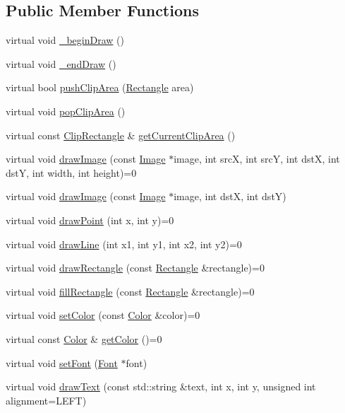 \subsection*{Public Member Functions}
\begin{DoxyCompactItemize}
\item 
virtual void \hyperlink{classgcn_1_1Graphics_a85e8107504f70fa460b844fb2259c653}{\+\_\+begin\+Draw} ()
\item 
virtual void \hyperlink{classgcn_1_1Graphics_af6b9381e34ec34f10e9bbf77b7b00c78}{\+\_\+end\+Draw} ()
\item 
virtual bool \hyperlink{classgcn_1_1Graphics_ab8f8773da6aa70f5fb554c2a2815c496}{push\+Clip\+Area} (\hyperlink{classgcn_1_1Rectangle}{Rectangle} area)
\item 
virtual void \hyperlink{classgcn_1_1Graphics_a11a3be7969db7490df8a02cb4549b443}{pop\+Clip\+Area} ()
\item 
virtual const \hyperlink{classgcn_1_1ClipRectangle}{Clip\+Rectangle} \& \hyperlink{classgcn_1_1Graphics_a642535039e421b0530bd85d71b8f7151}{get\+Current\+Clip\+Area} ()
\item 
virtual void \hyperlink{classgcn_1_1Graphics_aeb284b30f59d5cfa4c4e25130f4c164e}{draw\+Image} (const \hyperlink{classgcn_1_1Image}{Image} $\ast$image, int srcX, int srcY, int dstX, int dstY, int width, int height)=0
\item 
virtual void \hyperlink{classgcn_1_1Graphics_aed30c3aa213a2d225b1c119b3f5f8d60}{draw\+Image} (const \hyperlink{classgcn_1_1Image}{Image} $\ast$image, int dstX, int dstY)
\item 
virtual void \hyperlink{classgcn_1_1Graphics_adfd989a2a8c6771c6368b25f3977ecf4}{draw\+Point} (int x, int y)=0
\item 
virtual void \hyperlink{classgcn_1_1Graphics_a92af7e5f5ed6ebf692803bc1bd1d5db5}{draw\+Line} (int x1, int y1, int x2, int y2)=0
\item 
virtual void \hyperlink{classgcn_1_1Graphics_a8ffb254f53931ce3809a6f10307fcbf2}{draw\+Rectangle} (const \hyperlink{classgcn_1_1Rectangle}{Rectangle} \&rectangle)=0
\item 
virtual void \hyperlink{classgcn_1_1Graphics_a5caac226a94ecf8fdfee1da7cd14f0df}{fill\+Rectangle} (const \hyperlink{classgcn_1_1Rectangle}{Rectangle} \&rectangle)=0
\item 
virtual void \hyperlink{classgcn_1_1Graphics_a7f438ae2b4cc09c66d77a9b9cb591e7c}{set\+Color} (const \hyperlink{classgcn_1_1Color}{Color} \&color)=0
\item 
virtual const \hyperlink{classgcn_1_1Color}{Color} \& \hyperlink{classgcn_1_1Graphics_a509769aaeb7356cd0f595f3ddb962e49}{get\+Color} ()=0
\item 
virtual void \hyperlink{classgcn_1_1Graphics_a7415290eb8b075fae0b4a6fce3912f4e}{set\+Font} (\hyperlink{classgcn_1_1Font}{Font} $\ast$font)
\item 
virtual void \hyperlink{classgcn_1_1Graphics_a664fcd573d3e002d9096abdb8ce3279e}{draw\+Text} (const std\+::string \&text, int x, int y, unsigned int alignment=L\+E\+FT)
\end{DoxyCompactItemize}
